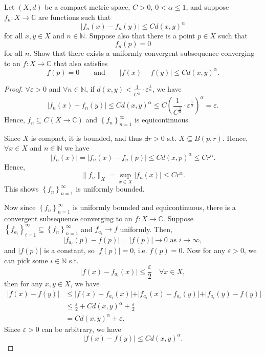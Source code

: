 \begin{problem}

    Let \((X,d)\) be a compact metric space, \(C>0\), \(0<\alpha\le 1\), and
    suppose \(f_n:X\to \mathbb{C}\) are functions such that
    \[
    |f_n(x)-f_n(y)|\le C d(x,y)^\alpha
    \]
    for all \(x,y\in X\) and \(n\in\mathbb{N}\). Suppose also that there is a point
    \(p\in X\) such that
    \[
    f_n(p)=0
    \]
    for all \(n\). Show that there exists a uniformly convergent subsequence
    converging to an \(f:X\to\mathbb{C}\) that also satisfies
    \[
    f(p)=0
    \qquad\text{and}\qquad
    |f(x)-f(y)|\le C d(x,y)^\alpha .
    \]
    
\end{problem}

\begin{proof}
    \(\forall \varepsilon > 0\) and \(\forall n \in \mathbb{N}\), if \(d(x, y) < \frac{1}{C^{\frac{1}{\alpha}}} \cdot \varepsilon^{\frac{1}{\alpha}}\), we have 
    \[
        \vert f_n(x) - f_n(y) \vert \le C d(x, y)^\alpha \le C \left( \frac{1}{C^{\frac{1}{\alpha}}} \cdot \varepsilon^{\frac{1}{\alpha}} \right)^\alpha = \varepsilon.  
    \]   
    Hence, \(f_n \subseteq C(X \to \mathbb{C})\) and \(\left\{ f_n \right\}_{n=1}^{\infty} \) is equicontinuous.
    
    Since \(X\) is compact, it is bounded, and thus \(\exists r > 0\) s.t. \(X \subseteq B(p, r)\). Hence, \(\forall x \in X\) and \(n \in \mathbb{N}\) we have 
    \[
        \vert f_n(x) \vert = \vert f_n(x) - f_n(p) \vert \le C d(x, p)^\alpha \le C r^\alpha.  
    \]     
    Hence, 
    \[
        \lVert f_n \rVert_X = \sup _{x \in X} \vert f_n(x) \vert \le Cr^\alpha.  
    \]
    This shows \(\left\{ f_n \right\}_{n=1}^{\infty} \) is uniformly bounded. 
    
    Now since \(\left\{ f_n \right\}_{n=1}^{\infty} \) is uniformly bounded and equicontinuous, there is a convergent subsequence converging to an \(f: X \to \mathbb{C}\). Suppose \(\left\{ f_{a_i} \right\}_{i=1}^{\infty} \subseteq \left\{ f_n \right\}_{n=1}^{\infty} \) and \(f_{a_i} \to f\) uniformly. Then,
    \[
        \vert f_{a_i}(p) - f(p) \vert = \vert f(p) \vert \to 0 \text{ as } i \to \infty,   
    \]    
    and \(\vert f(p) \vert \) is a constant, so \(\vert f(p) \vert = 0 \), i.e. \(f(p) = 0\). Now for any \(\varepsilon > 0\), we can pick some \(i \in \mathbb{N} \) s.t. 
    \[
        \vert f(x) - f_{a_i}(x) \vert \le \frac{\varepsilon}{2} \quad \forall x \in X, 
    \]     
    then for any \(x, y \in X\), we have
    \begin{align*}
        \vert f(x) - f(y) \vert &\le \vert f(x) - f_{a_i}(x) \vert + \vert f_{a_i}(x) - f_{a_i}(y) \vert + \vert f_{a_i}(y) - f(y) \vert \\
        &\le \frac{\varepsilon}{2} + C d(x, y)^\alpha + \frac{\varepsilon}{2} \\
        &= C d(x, y)^\alpha + \varepsilon.  
    \end{align*}  
    Since \(\varepsilon > 0\) can be arbitrary, we have 
    \[
        \vert f(x) - f(y) \vert \le C d(x, y)^\alpha. 
    \]  
\end{proof}